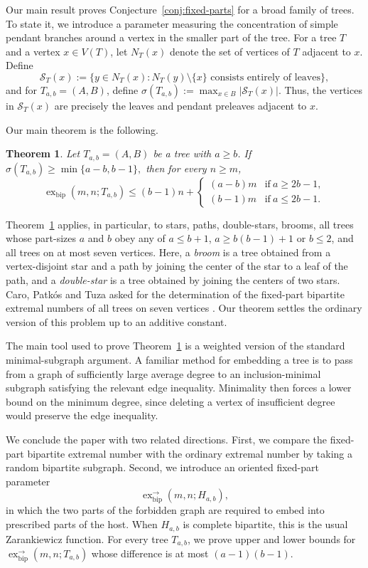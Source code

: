 \documentclass[12pt]{article}
\newtheorem{theorem}{Theorem}[section]
\theoremstyle{definition}
\theoremstyle{remark}
\newcommand{\exbip}{\operatorname{ex}_{\mathrm{bip}}}
\newcommand{\exor}{\operatorname{ex}^{\rightarrow}_{\mathrm{bip}}}
\begin{document}
Our main result proves Conjecture~\ref{conj:fixed-parts} for a broad family of trees. To state it, we introduce a parameter measuring the concentration of simple pendant branches around a vertex in the smaller part of the tree. For a tree $T$ and a vertex $x\in V(T)$, let $N_T(x)$ denote the set of vertices  of $T$ adjacent to $x$. Define
\[
    \mathcal S_T(x):=\{y\in N_T(x):N_T(y)\setminus\{x\}\text{ consists entirely of leaves}\},
\]
and for $T_{a,b}=(A,B)$, define $\sigma(T_{a,b}):=\max_{x\in B}|\mathcal S_T(x)|$.  Thus, the vertices in $\mathcal S_T(x)$ are precisely the leaves and pendant preleaves adjacent to $x$.

Our main theorem is the following.

\begin{theorem}\label{thm:main}
Let $T_{a,b}=(A,B)$ be a tree with $a\ge b$. If $\sigma(T_{a,b})\ge \min\{a-b,b-1\},$ then for every $n\geq m$,
\[
    \exbip(m,n;T_{a,b})\le(b-1)n+\begin{cases}
    (a-b)m&\text{if}\ a\geq2b-1,\\
    (b-1)m&\text{if}\ a\leq2b-1.
    \end{cases}
\]
\end{theorem}

Theorem~\ref{thm:main} applies, in particular, to stars, paths, double-stars, brooms, all trees whose part-sizes $a$ and $b$ obey any of $a\leq b+1$, $a\geq b(b-1)+1$ or $b\leq 2$, and all trees on at most seven vertices. Here, a \emph{broom} is a tree obtained from a vertex-disjoint star and a path by joining the center of the star to a leaf of the path, and a \emph{double-star} is a tree obtained by joining the centers of two stars. Caro, Patk\'os and Tuza asked for the determination of the fixed-part bipartite extremal numbers of all trees on seven vertices \cite{caro2025}. Our theorem settles the ordinary version of this problem up to an additive constant.

The main tool used to prove Theorem~\ref{thm:main} is a weighted version of the standard minimal-subgraph argument. A familiar method for embedding a tree is to pass from a graph of sufficiently large average degree to an inclusion-minimal subgraph satisfying the relevant edge inequality. Minimality then forces a lower bound on the minimum degree, since deleting a vertex of insufficient degree would preserve the edge inequality.

We conclude the paper with two related directions. First, we compare the fixed-part bipartite extremal number with the ordinary extremal number by taking a random bipartite subgraph. Second, we introduce an oriented fixed-part parameter
\[
\exor(m,n;H_{a,b}),
\]
in which the two parts of the forbidden graph are required to embed into prescribed parts of the host. When $H_{a,b}$ is complete bipartite, this is the usual Zarankiewicz function. For every tree $T_{a,b}$, we prove upper and lower bounds for $\exor(m,n;T_{a,b})$ whose difference is at most $(a-1)(b-1)$.
\end{document}

